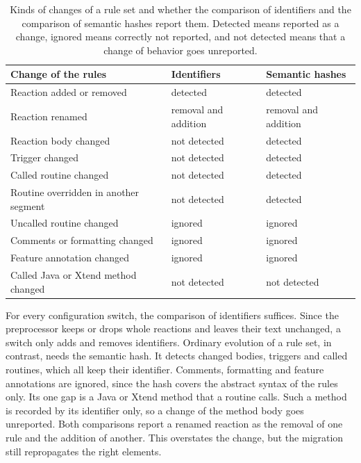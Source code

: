 \begin{table}[htbp]
    \centering
    \begin{tabular}{|l|l|l|}
        \hline
        \textbf{Change of the rules}          & \textbf{Identifiers} & \textbf{Semantic hashes} \\
        \hline
        Reaction added or removed             & detected             & detected                 \\
        \hline
        Reaction renamed                      & removal and addition & removal and addition     \\
        \hline
        Reaction body changed                 & not detected         & detected                 \\
        \hline
        Trigger changed                       & not detected         & detected                 \\
        \hline
        Called routine changed                & not detected         & detected                 \\
        \hline
        Routine overridden in another segment & not detected         & detected                 \\
        \hline
        Uncalled routine changed              & ignored              & ignored                  \\
        \hline
        Comments or formatting changed        & ignored              & ignored                  \\
        \hline
        Feature annotation changed            & ignored              & ignored                  \\
        \hline
        Called Java or Xtend method changed   & not detected         & not detected             \\
        \hline
    \end{tabular}
    \caption{Kinds of changes of a rule set and whether the comparison of identifiers and the comparison of semantic hashes report them. Detected means reported as a change, ignored means correctly not reported, and not detected means that a change of behavior goes unreported.}
    \label{table:rule-change-kinds}
\end{table}

For every configuration switch, the comparison of identifiers suffices.
Since the preprocessor keeps or drops whole reactions and leaves their text unchanged, a switch only adds and removes identifiers.
Ordinary evolution of a rule set, in contrast, needs the semantic hash.
It detects changed bodies, triggers and called routines, which all keep their identifier.
Comments, formatting and feature annotations are ignored, since the hash covers the abstract syntax of the rules only.
Its one gap is a Java or Xtend method that a routine calls.
Such a method is recorded by its identifier only, so a change of the method body goes unreported.
Both comparisons report a renamed reaction as the removal of one rule and the addition of another.
This overstates the change, but the migration still repropagates the right elements.


